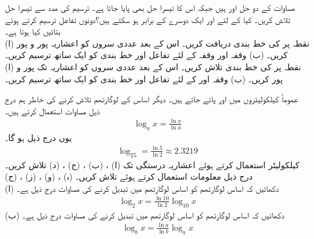 مساوات  کے دو حل  اور   ہیں جبکہ اس کا تیسرا حل بھی پایا جاتا ہے۔ ترسیم کی مدد سے تیسرا حل تلاش کریں۔
کیا  کے لئے   اور  ایک دوسرے کے برابر ہو سکتے ہیں؟دونوں تفاعل ترسیم کرتے ہوئے بتائیں کیا ہوتا ہے۔
\\
(ا) نقطہ  پر  کی خط بندی دریافت کریں۔ اس کے بعد عددی سروں کو  اعشاریہ  پور و پور کریں۔ (ب) وقفہ  اور وقفہ  کے لئے تفاعل اور خط بندی کو ایک ساتھ ترسیم کریں۔
\\
(ا) نقطہ  پر  کی خط بندی تلاش کریں۔ اس کے بعد عددی سروں کو  اعشاریہ تک پور و پور کریں۔   (ب) وقفہ  اور  کے لئے تفاعل اور خط بندی کو ایک ساتھ ترسیم کریں۔

عموماً کیلکولیٹروں میں  اور  پائے جاتے ہیں۔ دیگر اساس کے لوگارتھم تلاش کرنے کی خاطر ہم درج ذیل مساوات استعمال کرتے ہیں۔
\begin{align*}
\log_ax=\frac{\ln x}{\ln a}
\end{align*}
یوں درج ذیل ہو گا۔
\begin{align*}
\log_25=\frac{\ln 5}{\ln 2}\approx 2.3219
\end{align*}
کیلکولیٹر استعمال کرتے ہوئے   اعشاریہ درستگی تک 
(ا) ، (ب) ، (ج) ، (د)  تلاش کریں۔ درج ذیل معلومات استعمال کرتے ہوئے  تلاش کریں۔
(ہ) ،  (و) ،  (ز) ،  (ح) 
\\
(ا) دکھائیں کہ اساس  لوگارتھم کو اساس  لوگارتھم میں تبدیل کرنے کی مساوات درج ذیل ہے۔
\begin{align*}
\log_2x=\frac{\ln 10}{\ln 2}\log_{10}x
\end{align*}
(ب) دکھائیں کہ اساس   لوگارتھم کو اساس  لوگارتھم میں تبدیل کرنے  کی مساوات درج ذیل ہے۔
\begin{align*}
\log_bx=\frac{\ln a}{\ln b}\log_ax
\end{align*}

